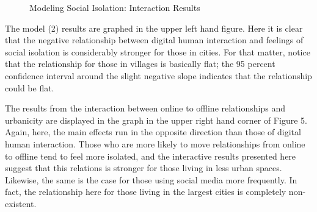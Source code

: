 \documentclass[
  letterpaper,
  DIV=11,
  numbers=noendperiod]{scrartcl}
\begin{document}
\begin{figure}


\caption{\label{fig-social-isolation-interactions}Modeling Social
Isolation: Interaction Results}

\end{figure}%

The model (2) results are graphed in the upper left hand figure. Here it
is clear that the negative relationship between digital human
interaction and feelings of social isolation is considerably stronger
for those in cities. For that matter, notice that the relationship for
those in villages is basically flat; the 95 percent confidence interval
around the slight negative slope indicates that the relationship could
be flat.

The results from the interaction between online to offline relationships
and urbanicity are displayed in the graph in the upper right hand corner
of Figure 5. Again, here, the main effects run in the opposite direction
than those of digital human interaction. Those who are more likely to
move relationships from online to offline tend to feel more isolated,
and the interactive results presented here suggest that this relations
is stronger for those living in less urban spaces. Likewise, the same is
the case for those using social media more frequently. In fact, the
relationship here for those living in the largest cities is completely
non-existent.
\end{document}
